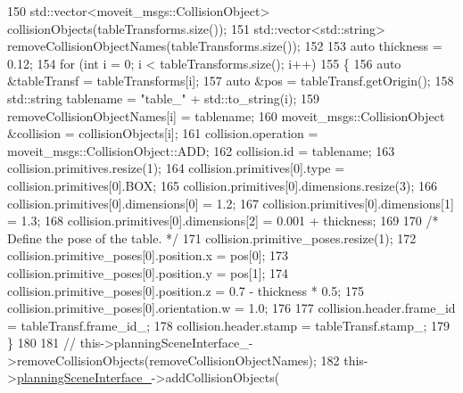 \begin{DoxyCode}
150                         std::vector<moveit\_msgs::CollisionObject> collisionObjects(tableTransforms.size());
151                         std::vector<std::string> removeCollisionObjectNames(tableTransforms.size());
152 
153                         \textcolor{keyword}{auto} thickness = 0.12;
154                         \textcolor{keywordflow}{for} (\textcolor{keywordtype}{int} i = 0; i < tableTransforms.size(); i++)
155                         \{
156                             \textcolor{keyword}{auto} &tableTransf = tableTransforms[i];
157                             \textcolor{keyword}{auto} &pos = tableTransf.getOrigin();
158                             std::string tablename = \textcolor{stringliteral}{"table\_"} + std::to\_string(i);
159                             removeCollisionObjectNames[i] = tablename;
160                             moveit\_msgs::CollisionObject &collision = collisionObjects[i];
161                             collision.operation = moveit\_msgs::CollisionObject::ADD;
162                             collision.id = tablename;
163                             collision.primitives.resize(1);
164                             collision.primitives[0].type = collision.primitives[0].BOX;
165                             collision.primitives[0].dimensions.resize(3);
166                             collision.primitives[0].dimensions[0] = 1.2;
167                             collision.primitives[0].dimensions[1] = 1.3;
168                             collision.primitives[0].dimensions[2] = 0.001 + thickness;
169 
170                             \textcolor{comment}{/* Define the pose of the table. */}
171                             collision.primitive\_poses.resize(1);
172                             collision.primitive\_poses[0].position.x = pos[0];
173                             collision.primitive\_poses[0].position.y = pos[1];
174                             collision.primitive\_poses[0].position.z = 0.7 - thickness * 0.5;
175                             collision.primitive\_poses[0].orientation.w = 1.0;
176 
177                             collision.header.frame\_id = tableTransf.frame\_id\_;
178                             collision.header.stamp = tableTransf.stamp\_;
179                         \}
180 
181                         \textcolor{comment}{//
      this->planningSceneInterface\_->removeCollisionObjects(removeCollisionObjectNames);}
182                         this->\hyperlink{classsm__moveit__4_1_1cl__perception__system_1_1ClPerceptionSystem_a7b0311554dc2efc15db1999adea877cb}{planningSceneInterface\_}->addCollisionObjects(

\end{DoxyCode}

